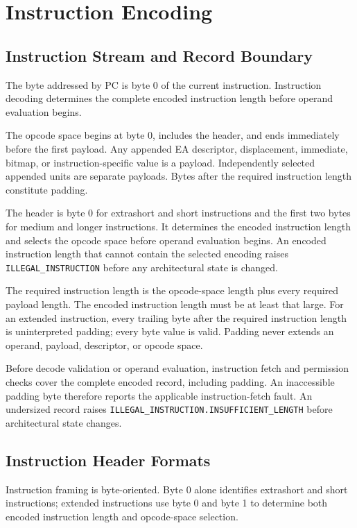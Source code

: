 \clearpage
\section{Instruction Encoding}\label{page:instruction-encoding}\label{section:instruction-header-formats}

\subsection{Instruction Stream and Record Boundary}
The byte addressed by PC is byte 0 of the current instruction. Instruction decoding determines the complete
encoded instruction length before operand evaluation begins.

The opcode space begins at byte 0, includes the header, and ends immediately before the first payload. Any appended
EA descriptor, displacement, immediate, bitmap, or instruction-specific value is a payload. Independently selected
appended units are separate payloads. Bytes after the required instruction length constitute padding.

The header is byte 0 for extrashort and short instructions and the first two bytes for medium and longer
instructions. It determines the encoded instruction length and selects the opcode space before operand evaluation
begins. An encoded instruction length that cannot contain the selected encoding raises
\texttt{ILLEGAL\_INSTRUCTION} before any architectural state is changed.

The required instruction length is the opcode-space length plus every required payload length. The encoded
instruction length must be at least that large. For an extended instruction, every trailing byte after the required
instruction length is uninterpreted padding; every byte value is valid. Padding never extends an operand, payload,
descriptor, or opcode space.

Before decode validation or operand evaluation, instruction fetch and permission checks cover the complete encoded
record, including padding. An inaccessible padding byte therefore reports the applicable instruction-fetch fault.
An undersized record raises \texttt{ILLEGAL\_INSTRUCTION.INSUFFICIENT\_LENGTH} before architectural state changes.

\subsection{Instruction Header Formats}

Instruction framing is byte-oriented. Byte 0 alone identifies extrashort and short instructions; extended
instructions use byte 0 and byte 1 to determine both encoded instruction length and opcode-space selection.

